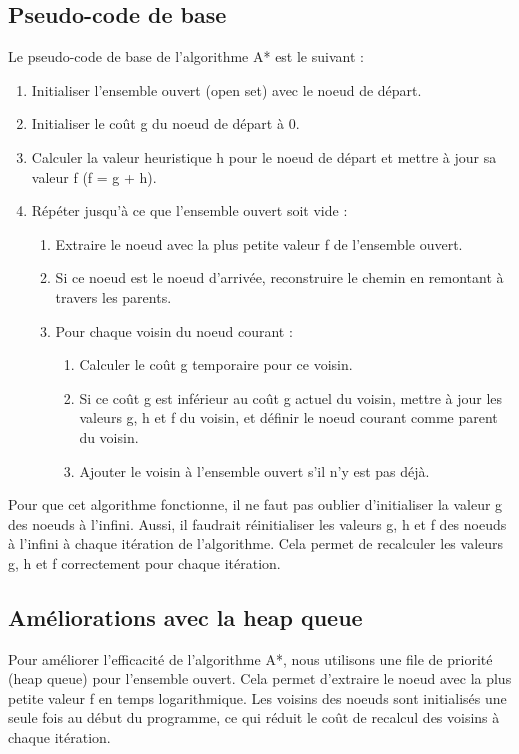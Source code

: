 \subsection{Pseudo-code de base}
Le pseudo-code de base de l'algorithme A* est le suivant :
\begin{enumerate}
    \item Initialiser l'ensemble ouvert (open set) avec le noeud de départ.
    \item Initialiser le coût g du noeud de départ à 0.
    \item Calculer la valeur heuristique h pour le noeud de départ et mettre à jour sa valeur f (f = g + h).
    \item Répéter jusqu'à ce que l'ensemble ouvert soit vide :
    \begin{enumerate}
        \item Extraire le noeud avec la plus petite valeur f de l'ensemble ouvert.
        \item Si ce noeud est le noeud d'arrivée, reconstruire le chemin en remontant à travers les parents.
        \item Pour chaque voisin du noeud courant :
        \begin{enumerate}
            \item Calculer le coût g temporaire pour ce voisin.
            \item Si ce coût g est inférieur au coût g actuel du voisin, mettre à jour les valeurs g, h et f du voisin, et définir le noeud courant comme parent du voisin.
            \item Ajouter le voisin à l'ensemble ouvert s'il n'y est pas déjà.
        \end{enumerate}
    \end{enumerate}
\end{enumerate}

Pour que cet algorithme fonctionne, il ne faut pas oublier d'initialiser la valeur g des noeuds à l'infini. Aussi, il faudrait réinitialiser les valeurs g, h et f des noeuds à l'infini à chaque itération de l'algorithme. Cela permet de recalculer les valeurs g, h et f correctement pour chaque itération.

\subsection{Améliorations avec la heap queue}
Pour améliorer l'efficacité de l'algorithme A*, nous utilisons une file de priorité (heap queue) pour l'ensemble ouvert. Cela permet d'extraire le noeud avec la plus petite valeur f en temps logarithmique. Les voisins des noeuds sont initialisés une seule fois au début du programme, ce qui réduit le coût de recalcul des voisins à chaque itération.

